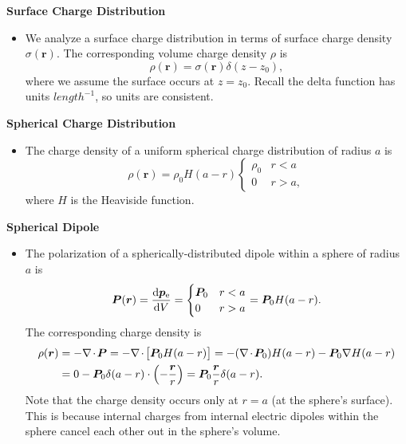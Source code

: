 \documentclass[11pt, a4paper]{article}
\renewcommand{\vec}[1]{\bm{#1}} %
\renewcommand{\r}{\vec{r}}
\newcommand{\pe}{\vec{p}_{\text{e}}}  %
\renewcommand{\div}{\nabla \mspace{-2mu} \cdot \mspace{-2mu}}
\renewcommand{\grad}{\nabla}
\begin{document}
\textbf{Surface Charge Distribution}
\begin{itemize}
	\item We analyze a surface charge distribution in terms of surface charge density $ \sigma(\r) $. The corresponding volume charge density $ \rho $ is
	\begin{equation*}
		\rho(\r) = \sigma(\r) \delta(z - z_{0}),
	\end{equation*}
	where we assume the surface occurs at $ z = z_{0} $. Recall the delta function has units $ \si{length}^{-1} $, so units are consistent.
\end{itemize}

\textbf{Spherical Charge Distribution}
\begin{itemize}	
	\item The charge density of a uniform spherical charge distribution of radius $ a $ is
	\begin{equation*}
		\rho(\r) = \rho_{0}H(a - r)
		\begin{cases}
			\rho_{0} & r < a\\
			0 & r > a,
		\end{cases}
	\end{equation*}
	where $ H $ is the Heaviside function.
\end{itemize}
	
\textbf{Spherical Dipole}
\begin{itemize}
	\item The polarization of a spherically-distributed dipole within a sphere of radius $ a $ is 
	\begin{equation*}
		\vec{P}(\r) = \dv{\pe}{V} = 
		\begin{cases}
			\vec{P}_{0} & r < a\\
			0 & r > a
		\end{cases}
		= \vec{P}_{0}H(a - r).
	\end{equation*}
	The corresponding charge density is
	\begin{align*}
		\rho(\r) &= - \div \vec{P} = - \div \big[\vec{P}_{0}H(a - r)\big] = - (\div \vec{P}_{0})H(a - r) - \vec{P}_{0} \grad H(a -r)\\
		&= 0 - \vec{P}_{0} \delta(a-r) \cdot \left (-\frac{\r}{r}\right) = \vec{P}_{0}\frac{\r}{r} \delta(a-r).
	\end{align*}
	Note that the charge density occurs only at $ r = a $ (at the sphere's surface). This is because internal charges from internal electric dipoles within the sphere cancel each other out in the sphere's volume.
\end{itemize}
\end{document}
